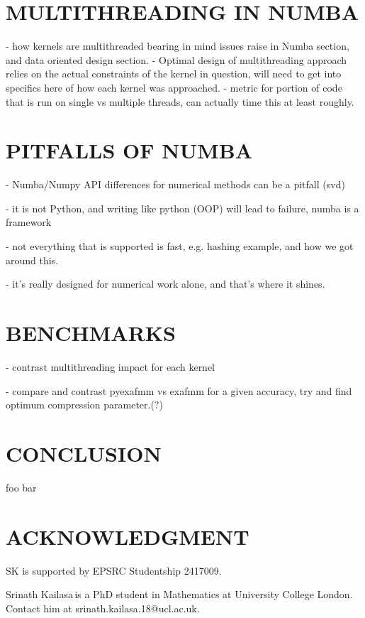 \documentclass{IEEEcsmag}
\begin{document}
\section{MULTITHREADING IN NUMBA}

- how kernels are multithreaded bearing in mind issues raise in Numba section, and data oriented design section.
- Optimal design of multithreading approach relies on the actual constraints of the kernel in question, will need to get into specifics here of how each kernel was approached.
- metric for portion of code that is run on single vs multiple threads, can actually time this at least roughly.

\section{PITFALLS OF NUMBA}

- Numba/Numpy API differences for numerical methods can be a pitfall (svd)

- it is not Python, and writing like python (OOP) will lead to failure, numba is a framework

- not everything that is supported is fast, e.g. hashing example, and how we got around this.

- it's really designed for numerical work alone, and that's where it shines.

\section{BENCHMARKS}

- contrast multithreading impact for each kernel

- compare and contrast pyexafmm vs exafmm for a given accuracy, try and find optimum compression parameter.(?)

\section{CONCLUSION}

foo bar

\section{ACKNOWLEDGMENT}

SK is supported by EPSRC Studentship 2417009.





\begin{IEEEbiography}{Srinath Kailasa}{\,}is a PhD student in Mathematics at University College London. Contact him at srinath.kailasa.18@ucl.ac.uk.
\end{IEEEbiography}
\end{document}
